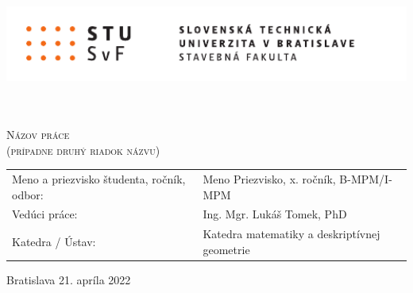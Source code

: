 \thispagestyle{empty}

\begin{center}%
	\includegraphics[height=2.8cm]{figures/STU-SvF-nfh}
\end{center}
\vspace{1cm}

\begin{flushright}
	\\
\end{flushright}
\vspace{3cm}

\begin{center}
	\textsc{\LARGE Názov práce}\\
	\vspace{2pt}
	\textsc{\LARGE (prípadne druhý riadok názvu)}
\end{center}
\vfill

\noindent
\begin{tabular}{ll}
	Meno a priezvisko študenta, ročník, odbor: & Meno Priezvisko, x. ročník, B-MPM/I-MPM\\
	Vedúci práce: & Ing. Mgr. Lukáš Tomek, PhD\\
	Katedra / Ústav: & Katedra matematiky a deskriptívnej geometrie
\end{tabular}
\vspace{3cm}

\begin{center}
	\Large Bratislava 21. apríla 2022 %
\end{center}
\restoregeometry
\newpage

\

